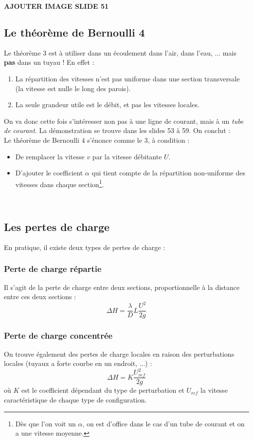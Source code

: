 \textbf{AJOUTER IMAGE SLIDE 51}
	
\subsection{Le théorème de Bernoulli 4}
Le théorème 3 est à utiliser dans un écoulement dans l'air, dans l'eau, ... mais \textbf{pas} dans
un tuyau ! En effet :
\begin{enumerate}
	\item La répartition des vitesses n'est pas uniforme dans une section transversale (la vitesse 
	      est nulle le long des parois).
	\item La seule grandeur utile est le débit, et pas les vitesses locales.
\end{enumerate}
On va donc cette fois s'intéresser non pas à une ligne de courant, mais à un \textit{tube de 
	courant}. La démonstration se trouve dans les slides 53 à 59. On conclut :\\
Le théorème de Bernoulli 4 s'énonce comme le 3, à condition :
\begin{itemize}
	\item De remplacer la vitesse $v$ par la vitesse débitante $U$.
	\item D'ajouter le coefficient $\alpha$ qui tient compte de la répartition non-uniforme des
	      vitesses dans chaque section\footnote{Dès que l'on voit un $\alpha$, on est d'office dans le 
	      cas d'un tube de courant et on a une vitesse moyenne.}.
\end{itemize}\ 
	
	
	
\subsection{Les pertes de charge}
En pratique, il existe deux types de pertes de charge :

\subsubsection{Perte de charge répartie}
Il s'agit de la perte de charge entre deux sections, proportionnelle à la distance entre ces
deux sections :
\begin{equation}
	\Delta H = \frac{\lambda}{D}L\frac{U^2}{2g}
\end{equation}

\subsubsection{Perte de charge concentrée}
On trouve également des pertes de charge locales en raison des perturbations locales (tuyaux a 
forte courbe en un endroit, ...) :
\begin{equation}
	\Delta H = K\frac{U_{ref}^2}{2g}
\end{equation}
où $K$ est le coefficient dépendant du type de perturbation et $U_{ref}$ la vitesse caractéristique
de chaque type de configuration.
